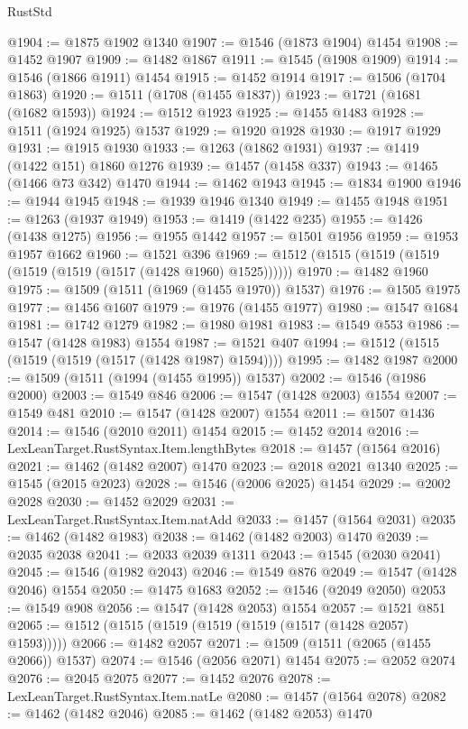\begin{lexlean}{RustStd}
\begin{coremodule}
@1904 := @1875 @1902 @1340
@1907 := @1546 (@1873 @1904) @1454
@1908 := @1452 @1907
@1909 := @1482 @1867
@1911 := @1545 (@1908 @1909)
@1914 := @1546 (@1866 @1911) @1454
@1915 := @1452 @1914
@1917 := @1506 (@1704 @1863)
@1920 := @1511 (@1708 (@1455 @1837))
@1923 := @1721 (@1681 (@1682 @1593))
@1924 := @1512 @1923
@1925 := @1455 @1483
@1928 := @1511 (@1924 @1925) @1537
@1929 := @1920 @1928
@1930 := @1917 @1929
@1931 := @1915 @1930
@1933 := @1263 (@1862 @1931)
@1937 := @1419 (@1422 @151) @1860 @1276
@1939 := @1457 (@1458 @337)
@1943 := @1465 (@1466 @73 @342) @1470
@1944 := @1462 @1943
@1945 := @1834 @1900
@1946 := @1944 @1945
@1948 := @1939 @1946 @1340
@1949 := @1455 @1948
@1951 := @1263 (@1937 @1949)
@1953 := @1419 (@1422 @235)
@1955 := @1426 (@1438 @1275)
@1956 := @1955 @1442
@1957 := @1501 @1956
@1959 := @1953 @1957 @1662
@1960 := @1521 @396
@1969 := @1512 (@1515 (@1519 (@1519 (@1519 (@1519 (@1517 (@1428 @1960) @1525))))))
@1970 := @1482 @1960
@1975 := @1509 (@1511 (@1969 (@1455 @1970)) @1537)
@1976 := @1505 @1975
@1977 := @1456 @1607
@1979 := @1976 (@1455 @1977)
@1980 := @1547 @1684
@1981 := @1742 @1279
@1982 := @1980 @1981
@1983 := @1549 @553
@1986 := @1547 (@1428 @1983) @1554
@1987 := @1521 @407
@1994 := @1512 (@1515 (@1519 (@1519 (@1517 (@1428 @1987) @1594))))
@1995 := @1482 @1987
@2000 := @1509 (@1511 (@1994 (@1455 @1995)) @1537)
@2002 := @1546 (@1986 @2000)
@2003 := @1549 @846
@2006 := @1547 (@1428 @2003) @1554
@2007 := @1549 @481
@2010 := @1547 (@1428 @2007) @1554
@2011 := @1507 @1436
@2014 := @1546 (@2010 @2011) @1454
@2015 := @1452 @2014
@2016 := LexLeanTarget.RustSyntax.Item.lengthBytes
@2018 := @1457 (@1564 @2016)
@2021 := @1462 (@1482 @2007) @1470
@2023 := @2018 @2021 @1340
@2025 := @1545 (@2015 @2023)
@2028 := @1546 (@2006 @2025) @1454
@2029 := @2002 @2028
@2030 := @1452 @2029
@2031 := LexLeanTarget.RustSyntax.Item.natAdd
@2033 := @1457 (@1564 @2031)
@2035 := @1462 (@1482 @1983)
@2038 := @1462 (@1482 @2003) @1470
@2039 := @2035 @2038
@2041 := @2033 @2039 @1311
@2043 := @1545 (@2030 @2041)
@2045 := @1546 (@1982 @2043)
@2046 := @1549 @876
@2049 := @1547 (@1428 @2046) @1554
@2050 := @1475 @1683
@2052 := @1546 (@2049 @2050)
@2053 := @1549 @908
@2056 := @1547 (@1428 @2053) @1554
@2057 := @1521 @851
@2065 := @1512 (@1515 (@1519 (@1519 (@1519 (@1517 (@1428 @2057) @1593)))))
@2066 := @1482 @2057
@2071 := @1509 (@1511 (@2065 (@1455 @2066)) @1537)
@2074 := @1546 (@2056 @2071) @1454
@2075 := @2052 @2074
@2076 := @2045 @2075
@2077 := @1452 @2076
@2078 := LexLeanTarget.RustSyntax.Item.natLe
@2080 := @1457 (@1564 @2078)
@2082 := @1462 (@1482 @2046)
@2085 := @1462 (@1482 @2053) @1470

\end{coremodule}
\end{lexlean}
